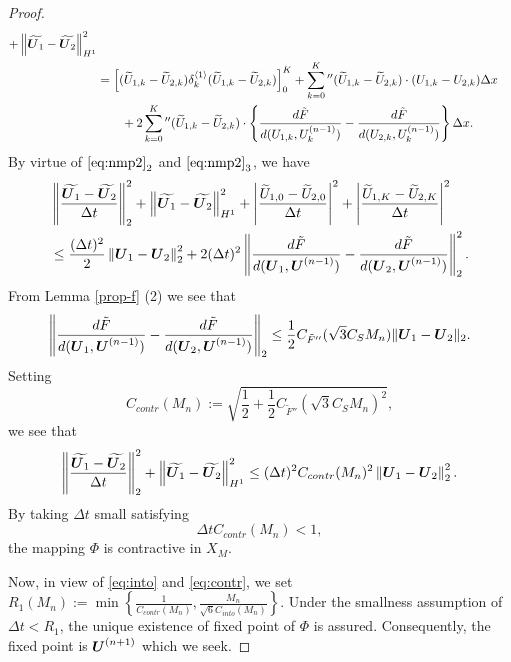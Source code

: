\documentclass[dvipdfmx-if-dvi,autodetect-engine,ja=standard]{amsart}
\numberwithin{equation}{section} %
\def\vect#1{\mbox{\boldmath $#1$}} %
\begin{document}
\begin{proof}
\begin{align*}
    + \left\| \widetilde{\vect{U}_1} - \widetilde{\vect{U}_2} \right\|_{H^1}^2 \\
    &= \left[ (\widetilde{U}_{1,k}-\widetilde{U}_{2,k}) \delta_k^{\langle 1 \rangle} (\widetilde{U}_{1,k}-\widetilde{U}_{2,k}) \right]_0^K 
    + \sum_{k=0}^K{}'' (\widetilde{U}_{1,k}-\widetilde{U}_{2,k}) \cdot (U_{1,k}-U_{2,k}) \Delta x \\
    &\qquad + 2\sum_{k=0}^K{}'' (\widetilde{U}_{1,k}-\widetilde{U}_{2,k}) \cdot \left\{ \frac{d \tilde{F}}{d(U_{1,k}, U_k^{(n-1)})}
    - \frac{d \tilde{F}}{d(U_{2,k}, U_k^{(n-1)})} \right\} \Delta x.
\end{align*}
By virtue of
$\eqref{eq:nmp2}_2$ and
$\eqref{eq:nmp2}_3$,
we have
\begin{align*}
    &\left\| \frac{\widetilde{\vect{U}_1} - \widetilde{\vect{U}_2}}{\Delta t} \right\|_2^2 
    + \left\| \widetilde{\vect{U}_1} - \widetilde{\vect{U}_2} \right\|_{H^1}^2
    +
    \left| \frac{\widetilde{U}_{1,0} - \widetilde{U}_{2,0}}{\Delta t} \right|^2
    +
    \left| \frac{\widetilde{U}_{1,K} - \widetilde{U}_{2,K}}{\Delta t} \right|^2
    \\
    &\leq \frac{(\Delta t)^2}{2}\left\| \vect{U}_1 - \vect{U}_2 \right\|_2^2 
    + 2
    (\Delta t)^2 \left\|   \frac{d \tilde{F}}{d(\vect{U}_1, \vect{U}^{(n-1)})} 
    -   \frac{d \tilde{F}}{d(\vect{U}_2, \vect{U}^{(n-1)})}
    \right\|_2^2.
\end{align*}
From Lemma \ref{prop-f} (2) we see that 
\[
\left\|   \frac{d \tilde{F}}{d(\vect{U}_1, \vect{U}^{(n-1)})} 
    -   \frac{d \tilde{F}}{d(\vect{U}_2, \vect{U}^{(n-1)})}
    \right\|_2
    \leq \frac{1}{2} C_{\tilde{F}''}(\sqrt{3} C_S M_n) \| \vect{U}_1 - \vect{U}_2 \|_2. 
\]
Setting 
\[
C_{contr}(M_n) := \sqrt{\frac{1}{2} + 
\frac{1}{2} C_{\tilde{F}''}(\sqrt{3} C_S M_n)^2}, 
\]
we see that 
\begin{align*}
    \left\| \frac{\widetilde{\vect{U}_1} - \widetilde{\vect{U}_2}}{\Delta t} \right\|_2^2 
    + \left\| \widetilde{\vect{U}_1} - \widetilde{\vect{U}_2} \right\|_{H^1}^2 
    \leq (\Delta t)^2 C_{contr}(M_n)^2 \left\| \vect{U}_1 - \vect{U}_2 \right\|_2^2. 
\end{align*}
By taking $\Delta t$ small satisfying 
\begin{equation}\label{eq:contr}
   \Delta t C_{contr}(M_n) < 1,  
\end{equation} 
the mapping $\Phi$ is contractive in $X_M$.

Now, in view of \eqref{eq:into} and \eqref{eq:contr},
we set
$R_1(M_n):=\min \left\{ \frac{1}{C_{contr}(M_n)}, \frac{M_n}{\sqrt{6} C_{into}(M_n)} \right\}$.
Under the smallness assumption of
$\Delta t < R_1$,
the unique existence of fixed point of
$\Phi$
is assured. 
Consequently,
the fixed point is $\vect{U}^{(n+1)}$ which we seek.
\end{proof}
\end{document}
